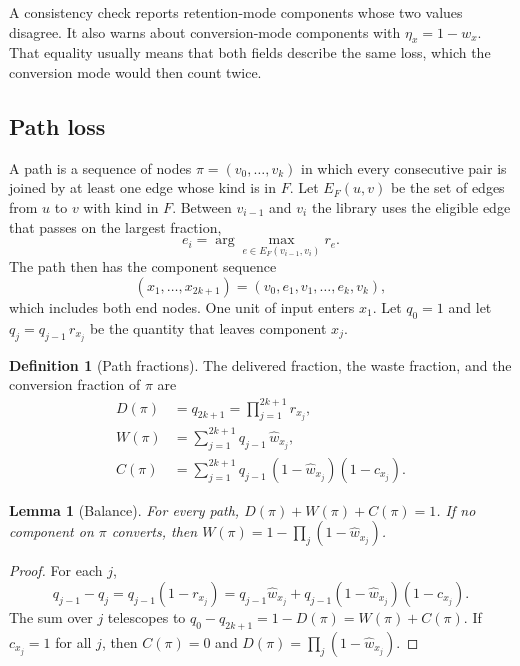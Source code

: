 \documentclass[12pt]{article}
\theoremstyle{plain}
\newtheorem{lemma}[theorem]{Lemma}
\theoremstyle{definition}
\newtheorem{definition}{Definition}
\begin{document}
A consistency check reports retention-mode components whose two values disagree. It also warns about conversion-mode components with $\eta_x=1-w_x$. That equality usually means that both fields describe the same loss, which the conversion mode would then count twice.

\subsection{Path loss}\label{sec:pathloss}

A path is a sequence of nodes $\pi=(v_0,\dots,v_k)$ in which every consecutive pair is joined by at least one edge whose kind is in $F$. Let $E_F(u,v)$ be the set of edges from $u$ to $v$ with kind in $F$. Between $v_{i-1}$ and $v_i$ the library uses the eligible edge that passes on the largest fraction,
\begin{equation}\label{eq:parallel}
    e_i=\arg\max_{e\in E_F(v_{i-1},v_i)} r_e .
\end{equation}
The path then has the component sequence
\[
    (x_1,\dots,x_{2k+1})=(v_0,e_1,v_1,\dots,e_k,v_k),
\]
which includes both end nodes. One unit of input enters $x_1$. Let $q_0=1$ and let $q_j=q_{j-1}\,r_{x_j}$ be the quantity that leaves component $x_j$.

\begin{definition}[Path fractions]\label{def:fractions}
The delivered fraction, the waste fraction, and the conversion fraction of $\pi$ are
\begin{align}
    D(\pi)&=q_{2k+1}=\prod_{j=1}^{2k+1} r_{x_j}, \label{eq:delivered}\\
    W(\pi)&=\sum_{j=1}^{2k+1} q_{j-1}\,\hat w_{x_j}, \label{eq:waste}\\
    C(\pi)&=\sum_{j=1}^{2k+1} q_{j-1}\,(1-\hat w_{x_j})(1-c_{x_j}). \label{eq:conv}
\end{align}
\end{definition}

\begin{lemma}[Balance]\label{lem:balance}
For every path, $D(\pi)+W(\pi)+C(\pi)=1$. If no component on $\pi$ converts, then $W(\pi)=1-\prod_{j}(1-\hat w_{x_j})$.
\end{lemma}
\begin{proof}
For each $j$,
\[
    q_{j-1}-q_j=q_{j-1}(1-r_{x_j})=q_{j-1}\hat w_{x_j}+q_{j-1}(1-\hat w_{x_j})(1-c_{x_j}).
\]
The sum over $j$ telescopes to $q_0-q_{2k+1}=1-D(\pi)=W(\pi)+C(\pi)$. If $c_{x_j}=1$ for all $j$, then $C(\pi)=0$ and $D(\pi)=\prod_j(1-\hat w_{x_j})$.
\end{proof}
\end{document}
